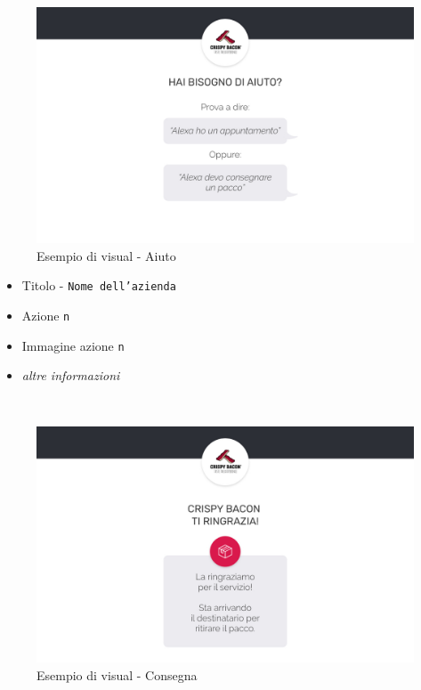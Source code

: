 \begin{minipage}{0.47\textwidth}
	\begin{figure}[H]
		\includegraphics[width=1\columnwidth]{immagini/aiuto_gui.jpg}
		\caption{\label{fig:esempioGUI2}Esempio di visual - Aiuto}
	\end{figure}
\end{minipage}
\begin{minipage}{0.5\textwidth}
	\begin{itemize}  
		\item Titolo - \texttt{Nome dell'azienda}
		\item Azione \texttt{n}
		\item Immagine azione \texttt{n}
		\item \textit{altre informazioni}
	\end{itemize}
\end{minipage}
\\[0.4cm]
\begin{minipage}{0.47\textwidth}
	\begin{figure}[H]
		\includegraphics[width=1\columnwidth]{immagini/consegna_gui.jpg}
		\caption{\label{fig:esempioGUI3}Esempio di visual - Consegna}
	\end{figure}
\end{minipage}
